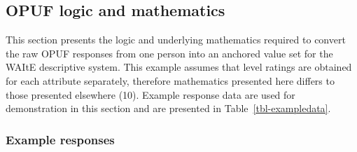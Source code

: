 \documentclass[
  letterpaper,
  DIV=11,
  numbers=noendperiod]{scrartcl}
\begin{document}
\subsection{OPUF logic and mathematics}\label{sec-OPUF_methods}

This section presents the logic and underlying mathematics required to
convert the raw OPUF responses from one person into an anchored value
set for the WAItE descriptive system. This example assumes that level
ratings are obtained for each attribute separately, therefore
mathematics presented here differs to those presented elsewhere (10).
Example response data are used for demonstration in this section and are
presented in Table~\ref{tbl-exampledata}.

\subsubsection{Example responses}\label{example-responses}
\end{document}
